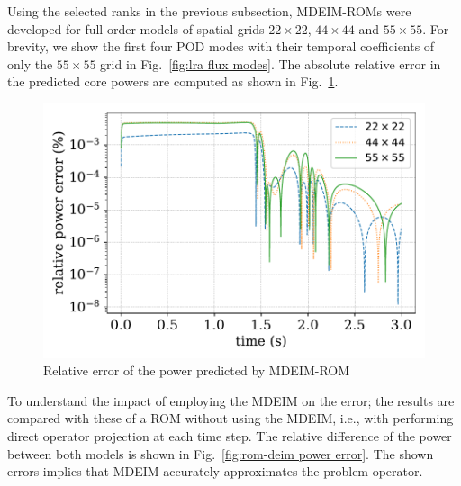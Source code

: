 \documentclass[]{interact}
\theoremstyle{plain}%
\theoremstyle{definition}
\theoremstyle{remark}
\begin{document}
Using the selected ranks in the previous subsection, MDEIM-ROMs were developed for full-order models of spatial grids $22\times 22$, $44\times44$ and $55 \times 55$.
For brevity, we show the first four POD modes with their temporal coefficients of only the $55 \times 55$ grid in Fig.~\ref{fig:lra flux modes}.
The absolute relative error in the predicted core powers are computed as shown in Fig.~\ref{fig:deim power error}.

\begin{figure}[H]
	\includegraphics[width=1.0\linewidth]{../figures/LRA_power_deim_relative_error.pdf}
	\caption{Relative error of the power predicted by MDEIM-ROM}
	\label{fig:deim power error}
\end{figure}

To understand the impact of employing the MDEIM on the error; the results are compared with these of a ROM without using the MDEIM, i.e., with performing direct operator projection at each time step.
The relative difference of the power between both models is shown in Fig.~\ref{fig:rom-deim power error}.
The shown errors implies that MDEIM accurately approximates the problem operator.
\end{document}
